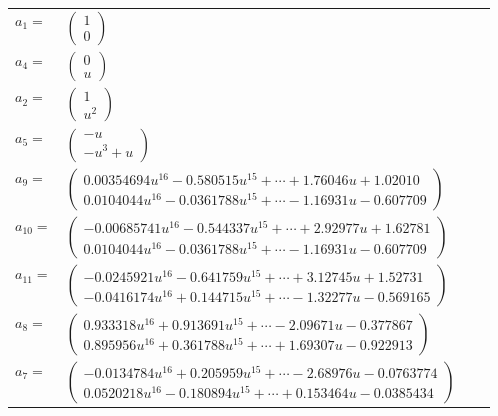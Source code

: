\documentclass[1p]{elsarticle_modified}
\theoremstyle{definition}
\begin{document}
\begin{tabular}{m{7pt} m{180pt} m{7pt} m{180pt} }
\flushright $a_{1}=$&$\begin{pmatrix}1\\0\end{pmatrix}$ \\
\flushright $a_{4}=$&$\begin{pmatrix}0\\u\end{pmatrix}$ \\
\flushright $a_{2}=$&$\begin{pmatrix}1\\u^2\end{pmatrix}$ \\
\flushright $a_{5}=$&$\begin{pmatrix}- u\\- u^3+u\end{pmatrix}$ \\
\flushright $a_{9}=$&$\begin{pmatrix}0.00354694 u^{16}-0.580515 u^{15}+\cdots+1.76046 u+1.02010\\0.0104044 u^{16}-0.0361788 u^{15}+\cdots-1.16931 u-0.607709\end{pmatrix}$ \\
\flushright $a_{10}=$&$\begin{pmatrix}-0.00685741 u^{16}-0.544337 u^{15}+\cdots+2.92977 u+1.62781\\0.0104044 u^{16}-0.0361788 u^{15}+\cdots-1.16931 u-0.607709\end{pmatrix}$ \\
\flushright $a_{11}=$&$\begin{pmatrix}-0.0245921 u^{16}-0.641759 u^{15}+\cdots+3.12745 u+1.52731\\-0.0416174 u^{16}+0.144715 u^{15}+\cdots-1.32277 u-0.569165\end{pmatrix}$ \\
\flushright $a_{8}=$&$\begin{pmatrix}0.933318 u^{16}+0.913691 u^{15}+\cdots-2.09671 u-0.377867\\0.895956 u^{16}+0.361788 u^{15}+\cdots+1.69307 u-0.922913\end{pmatrix}$ \\
\flushright $a_{7}=$&$\begin{pmatrix}-0.0134784 u^{16}+0.205959 u^{15}+\cdots-2.68976 u-0.0763774\\0.0520218 u^{16}-0.180894 u^{15}+\cdots+0.153464 u-0.0385434\end{pmatrix}$ \\

\end{tabular}
\end{document}
